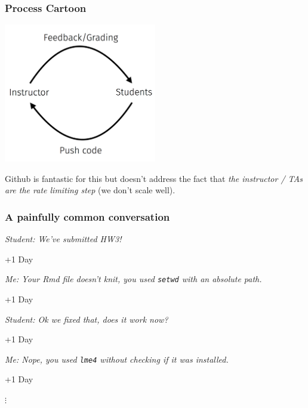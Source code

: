 \documentclass[12pt]{beamer}
\begin{document}
\begin{frame}
\frametitle{Process Cartoon}

\begin{center}
\includegraphics[width=0.5\textwidth]{imgs/cycle.png}
\end{center}

\pause

Github is fantastic for this but doesn't address the fact that \emph{the instructor / TAs are the rate limiting step} (we don't scale well).

\end{frame}


\begin{frame}[fragile]
\frametitle{A painfully common conversation}

{\footnotesize
\textit{Student: We've submitted HW3!}
%
\begin{center} +1 Day \end{center}
%
\textit{Me: Your Rmd file doesn't knit, you used \texttt{setwd} with an absolute path.}
%
\begin{center} +1 Day \end{center}
%
\textit{Student: Ok we fixed that, does it work now?}
%
\begin{center} +1 Day \end{center}
%
\textit{Me: Nope, you used \texttt{lme4} without checking if it was installed.}
%
\begin{center} +1 Day \end{center}
%
\begin{center} $\vdots$ \end{center}
}
\end{frame}

\end{document}
